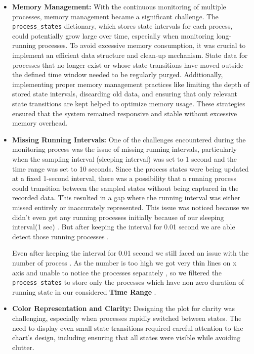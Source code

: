 \documentclass[12pt]{article}
\begin{document}
\begin{itemize}
     \item \textbf{Memory Management:} With the continuous monitoring of multiple processes, memory management became a significant challenge. The \texttt{process\_states} dictionary, which stores state intervals for each process, could potentially grow large over time, especially when monitoring long-running processes. To avoid excessive memory consumption, it was crucial to implement an efficient data structure and clean-up mechanism. State data for processes that no longer exist or whose state transitions have moved outside the defined time window needed to be regularly purged. Additionally, implementing proper memory management practices like limiting the depth of stored state intervals, discarding old data, and ensuring that only relevant state transitions are kept helped to optimize memory usage. These strategies ensured that the system remained responsive and stable without excessive memory overhead.

     \item \textbf{Missing Running Intervals:} One of the challenges encountered during the monitoring process was the issue of missing running intervals, particularly when the sampling interval (sleeping interval) was set to 1 second and the time range was set to 10 seconds. Since the process states were being updated at a fixed 1-second interval, there was a possibility that a running process could transition between the sampled states without being captured in the recorded data. This resulted in a gap where the running interval was either missed entirely or inaccurately represented. This issue was noticed because we didn't even get any running processes initially because of our sleeping interval(1 sec) . But after keeping the interval for 0.01 second we are able detect those running processes .

     Even after keeping the interval for 0.01 second we still faced an issue with the number of process . As the number is too high we got very thin lines on x axis and unable to notice the processes separately , so we filtered the \texttt{process\_states} to store only the processes which have non zero duration of running state in our considered \textbf{Time Range} .

     \item \textbf{Color Representation and Clarity:} Designing the plot for clarity was challenging, especially when processes rapidly switched between states. The need to display even small state transitions required careful attention to the chart's design, including ensuring that all states were visible while avoiding clutter.
\end{itemize}
\end{document}
